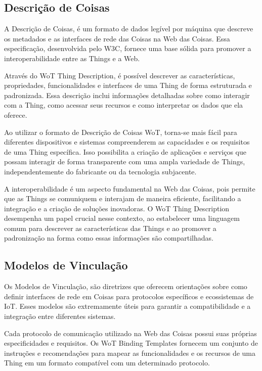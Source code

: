 \subsection{Descrição de Coisas}

A Descrição de Coisas, é um formato de dados legível por máquina que descreve os metadados e as interfaces de rede das Coisas na Web das Coisas. Essa especificação, desenvolvida pelo W3C, fornece uma base sólida para promover a interoperabilidade entre as Things e a Web.

Através do WoT Thing Description, é possível descrever as características, propriedades, funcionalidades e interfaces de uma Thing de forma estruturada e padronizada. Essa descrição inclui informações detalhadas sobre como interagir com a Thing, como acessar seus recursos e como interpretar os dados que ela oferece.

Ao utilizar o formato de Descrição de Coisas WoT, torna-se mais fácil para diferentes dispositivos e sistemas compreenderem as capacidades e os requisitos de uma Thing específica. Isso possibilita a criação de aplicações e serviços que possam interagir de forma transparente com uma ampla variedade de Things, independentemente do fabricante ou da tecnologia subjacente.

A interoperabilidade é um aspecto fundamental na Web das Coisas, pois permite que as Things se comuniquem e interajam de maneira eficiente, facilitando a integração e a criação de soluções inovadoras. O WoT Thing Description desempenha um papel crucial nesse contexto, ao estabelecer uma linguagem comum para descrever as características das Things e ao promover a padronização na forma como essas informações são compartilhadas.

\subsection{Modelos de Vinculação}

Os Modelos de Vinculação, são diretrizes que oferecem orientações sobre como definir interfaces de rede em Coisas para protocolos específicos e ecossistemas de IoT. Esses modelos são extremamente úteis para garantir a compatibilidade e a integração entre diferentes sistemas.

Cada protocolo de comunicação utilizado na Web das Coisas possui suas próprias especificidades e requisitos. Os WoT Binding Templates fornecem um conjunto de instruções e recomendações para mapear as funcionalidades e os recursos de uma Thing em um formato compatível com um determinado protocolo.

